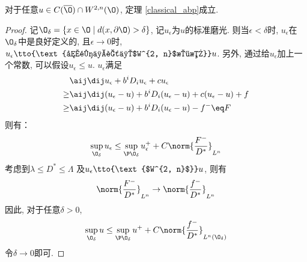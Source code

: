 \begin{corollary}
    对于任意$u \in C(\overline{\O})\cap W^{2, n}(\O)$, 定理 \eqref{classical_abp}成立.  
\end{corollary}
\begin{proof}
    记$\O_\delta = \{x \in \O \mid d(x, \partial \O ) > \delta\}$, 记$u_\epsilon$为$u$的标准磨光.  则当$\epsilon  < \delta$时, $u_\epsilon $在$\O_\delta$中是良好定义的, 且$\epsilon \to 0$时, $u_\epsilon \tto{\text{内闭一致且$W^{2, n}$收敛}} u$.  另外, 通过给$u_\epsilon$加上一个常数, 可以假设$u_\epsilon \le u$.  $u_\epsilon$满足
    \begin{equation}
        \begin{split}
            &\aij \dij u_\epsilon + b^iD_iu_\epsilon+cu_\epsilon  \\
            \ge& \aij \dij (u_\epsilon-u)+b^iD_i(u_\epsilon-u)+c(u_\epsilon-u)+f \\
            \ge & \aij \dij(u_\epsilon-u)+b^iD_i(u_\epsilon-u)-f^- \eq F
        \end{split}
    \end{equation}
    则有：
    \begin{equation}
        \sup_{\O_\delta} u_\epsilon\le \sup _{\P \O_\delta} u^+_\epsilon+C\norm{\frac{F^-}{D^*}}_{L^n}
    \end{equation}
    考虑到$\lambda \le D^* \le \Lambda$ 及$u_\epsilon \tto{\text{$W^{2, n}$}} u$, 则有
    \begin{equation}
        \norm{\frac{F^-}{D^*}}_{L^n} \to \norm{\frac{f^-}{D^*}}_{L^n}
    \end{equation}
    因此, 对于任意$\delta >0$, 
    \begin{equation}
        \sup_{\O_\delta} u \le \sup _{\P \O_\delta}u^+ +C\norm{\frac{f^-}{D^*}}_{L^n(\O_\delta)}
    \end{equation}
    令$\delta \to 0$即可.  
\end{proof}
